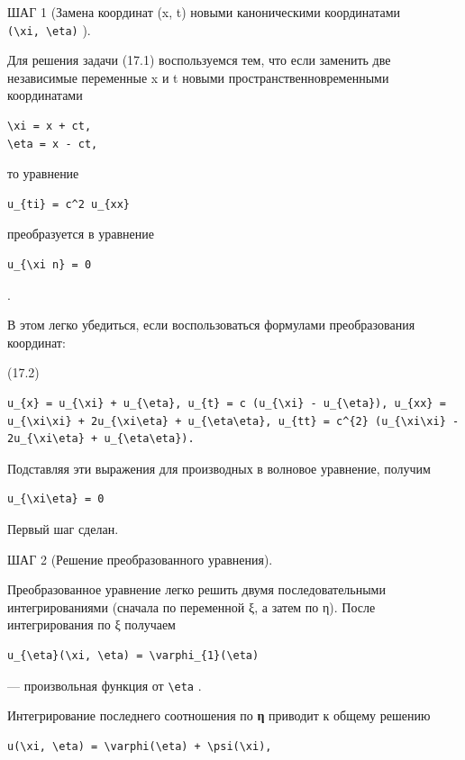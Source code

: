 \documentclass[
  ukrainian,
]{article}
\begin{document}
ШАГ 1 (Замена координат (x, t) новыми каноническими координатами
\texttt{(\textbackslash{}xi,\ \textbackslash{}eta)} ).

Для решения задачи (17.1) воспользуемся тем, что если заменить две
независимые переменные x и t новыми пространственновременными
координатами

\begin{verbatim}
\xi = x + ct,
\eta = x - ct,
\end{verbatim}

то уравнение

\begin{verbatim}
u_{ti} = c^2 u_{xx}
\end{verbatim}

преобразуется в уравнение

\begin{verbatim}
u_{\xi n} = 0
\end{verbatim}

.

В этом легко убедиться, если воспользоваться формулами преобразования
координат:

(17.2)

\begin{verbatim}
u_{x} = u_{\xi} + u_{\eta}, u_{t} = c (u_{\xi} - u_{\eta}), u_{xx} = u_{\xi\xi} + 2u_{\xi\eta} + u_{\eta\eta}, u_{tt} = c^{2} (u_{\xi\xi} - 2u_{\xi\eta} + u_{\eta\eta}).
\end{verbatim}

Подставляя эти выражения для производных в волновое уравнение, получим

\begin{verbatim}
u_{\xi\eta} = 0
\end{verbatim}

Первый шаг сделан.

ШАГ 2 (Решение преобразованного уравнения).

Преобразованное уравнение легко решить двумя последовательными
интегрированиями (сначала по переменной ξ, а затем по η). После
интегрирования по ξ получаем

\begin{verbatim}
u_{\eta}(\xi, \eta) = \varphi_{1}(\eta)
\end{verbatim}

--- произвольная функция от \texttt{\textbackslash{}eta} .

Интегрирование последнего соотношения по \textbf{η} приводит к общему
решению

\begin{verbatim}
u(\xi, \eta) = \varphi(\eta) + \psi(\xi),
\end{verbatim}
\end{document}
